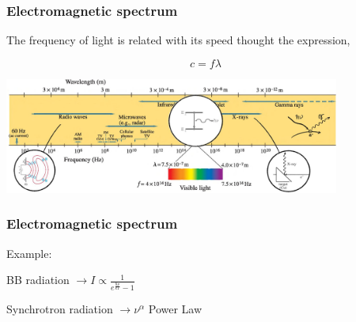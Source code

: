 \documentclass[]{beamer}
\begin{document}
\begin{frame}

\frametitle{Electromagnetic spectrum}

The frequency of light is related with its speed thought the expression,

\begin{equation*}
c=f\lambda
\end{equation*}

  \begin{center}
  \includegraphics[height=1.5in]{images5/spectrum5.jpg}
\end{center}



  \end{frame}





\begin{frame}

\frametitle{Electromagnetic spectrum}

Example:

\vspace{3mm}

BB radiation $\rightarrow I\propto \frac{1}{e^{\frac{\hbar \nu}{kT}}-1}$

\vspace{3mm}

Synchrotron radiation $\rightarrow \nu^{\alpha}$ Power Law


  \end{frame}

\end{document}
